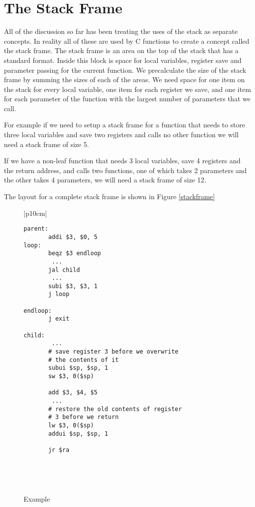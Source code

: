 \section{The Stack Frame}

All of the discussion so far has been treating the uses of the stack as 
separate concepts. In reality all of these are used by  C functions to create 
a concept called the stack frame. The stack frame is an area on the top of the 
stack that has a standard format. Inside this block is space for local 
variables, register save and parameter passing for the current function. We 
precalculate the size of the stack frame by summing the sizes of each of the 
areas. We need space for one item on the stack for every local variable, one 
item for each register we save, and one item for each parameter of the function 
with the largest number of parameters that we call.

For example if we need to setup a stack frame for a function that needs to 
store three local variables and save two registers and calls no other function 
we will need a stack frame of size 5.

If we have a non-leaf function that needs 3 local variables, save 4 registers 
and the return address, and calls two functions, one of which takes 2 parameters
and the other takes 4 parameters, we will need a stack frame of size 12.

The layout for a complete stack frame is shown in Figure \ref{stackframe}




%
%
\begin{figure}[!btp]

\begin{center}
\begin{tabular}{|p{10cm}|}
\hline
\begin{scriptsize}
\begin{verbatim}
parent:
       addi $3, $0, 5
loop:
       beqz $3 endloop
        ...
       jal child
        ...
       subi $3, $3, 1
       j loop

endloop:
       j exit

child:
        ...
       # save register 3 before we overwrite
       # the contents of it
       subui $sp, $sp, 1
       sw $3, 0($sp)

       add $3, $4, $5
        ...
       # restore the old contents of register
       # 3 before we return
       lw $3, 0($sp)
       addui $sp, $sp, 1

       jr $ra
\end{verbatim}
\end{scriptsize}
\\
\hline
\end{tabular}
\end{center}
\

\caption{Example}
\label{fig:paramexample}
\end{figure}


